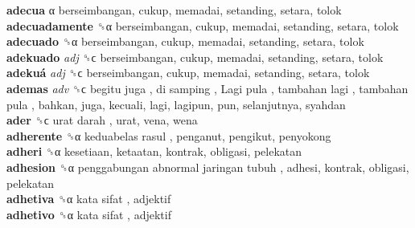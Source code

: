 \textbf{adecua} α  berseimbangan, cukup, memadai, setanding, setara, tolok  \\
\textbf{adecuadamente} ␝α  berseimbangan, cukup, memadai, setanding, setara, tolok  \\
\textbf{adecuado} ␝α  berseimbangan, cukup, memadai, setanding, setara, tolok  \\
\textbf{adekuado} \emph{adj}  ␝ϲ  berseimbangan, cukup, memadai, setanding, setara, tolok  \\
\textbf{adekuá} \emph{adj}  ␝ϲ  berseimbangan, cukup, memadai, setanding, setara, tolok  \\
\textbf{ademas} \emph{adv}  ␝ϲ   begitu juga ,  di samping ,  Lagi pula ,  tambahan lagi ,  tambahan pula , bahkan, juga, kecuali, lagi, lagipun, pun, selanjutnya, syahdan  \\
\textbf{ader} ␝ϲ   urat darah , urat, vena, wena  \\
\textbf{adherente} ␝α   keduabelas rasul , penganut, pengikut, penyokong  \\
\textbf{adheri} ␝α  kesetiaan, ketaatan, kontrak, obligasi, pelekatan  \\
\textbf{adhesion} ␝α   penggabungan abnormal jaringan tubuh , adhesi, kontrak, obligasi, pelekatan  \\
\textbf{adhetiva} ␝α   kata sifat , adjektif  \\
\textbf{adhetivo} ␝α   kata sifat , adjektif  \\
